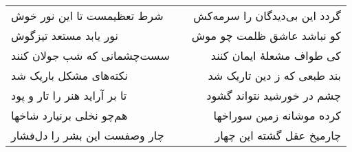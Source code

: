 \begin{center}
\begin{longtable}{l p{0.5cm} r}
شرط تعظیمست تا این نور خوش
&&
گردد این بی‌دیدگان را سرمه‌کش
\\
نور یابد مستعد تیزگوش
&&
کو نباشد عاشق ظلمت چو موش
\\
سست‌چشمانی که شب جولان کنند
&&
کی طواف مشعلهٔ ایمان کنند
\\
نکته‌های مشکل باریک شد
&&
بند طبعی که ز دین تاریک شد
\\
تا بر آراید هنر را تار و پود
&&
چشم در خورشید نتواند گشود
\\
هم‌چو نخلی برنیارد شاخها
&&
کرده موشانه زمین سوراخها
\\
چار وصفست این بشر را دل‌فشار
&&
چارمیخ عقل گشته این چهار
\\
\end{longtable}
\end{center}
